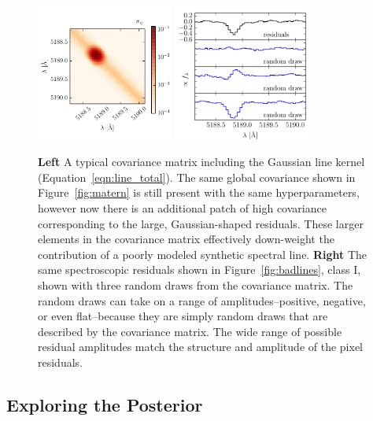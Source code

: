 \documentclass[iop,floatfix]{emulateapj}
\begin{document}
\begin{figure}[!htb]
\begin{center}
\includegraphics[width=0.4\textwidth]{figs/gauss_matrix.pdf}
\includegraphics[width=0.4\textwidth]{figs/gauss_draw.pdf}
\caption{\textbf{Left} A typical covariance matrix including the Gaussian line kernel (Equation~\ref{eqn:line_total}). The same global covariance shown in Figure~\ref{fig:matern} is still present with the same hyperparameters, however now there is an additional patch of high covariance corresponding to the large, Gaussian-shaped residuals. These larger elements in the covariance matrix effectively down-weight the contribution of a poorly modeled synthetic spectral line.
\textbf{Right} The same spectroscopic residuals shown in Figure~\ref{fig:badlines}, class I, shown with three random draws from the covariance matrix. The random draws can take on a range of amplitudes--positive, negative, or even flat--because they are simply random draws that are described by the covariance matrix. The wide range of possible residual amplitudes match the structure and amplitude of the pixel residuals.}
\label{fig:region}
\end{center}
\end{figure}


\subsection{Exploring the Posterior }
\label{subsec:MCMC}
\end{document}
